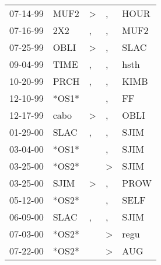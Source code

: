 \begin{supertabular}{p{0.07\textwidth}p{0.06\textwidth}p{0.02\textwidth}p{0.02\textwidth}p{0.06\textwidth}}
 07-14-99\textsuperscript{} &           MUF2\textsuperscript{} &     \textgreater &             , &          HOUR\textsuperscript{} \\
 07-16-99\textsuperscript{} &            2X2\textsuperscript{} &                , &             , &          MUF2\textsuperscript{} \\
 07-25-99\textsuperscript{} &           OBLI\textsuperscript{} &     \textgreater &             , &          SLAC\textsuperscript{} \\
 09-04-99\textsuperscript{} &           TIME\textsuperscript{} &                , &             , &          hsth\textsuperscript{} \\
 10-20-99\textsuperscript{} &           PRCH\textsuperscript{} &                , &             , &          KIMB\textsuperscript{} \\
 12-10-99\textsuperscript{} &                            *OS1* &                  &             , &            FF\textsuperscript{} \\
 12-17-99\textsuperscript{} &           cabo\textsuperscript{} &     \textgreater &             , &          OBLI\textsuperscript{} \\
 01-29-00\textsuperscript{} &           SLAC\textsuperscript{} &                , &             , &          SJIM\textsuperscript{} \\
 03-04-00\textsuperscript{} &                            *OS1* &                  &             , &          SJIM\textsuperscript{} \\
 03-25-00\textsuperscript{} &                            *OS2* &                  &  \textgreater &          SJIM\textsuperscript{} \\
 03-25-00\textsuperscript{} &           SJIM\textsuperscript{} &     \textgreater &             , &          PROW\textsuperscript{} \\
 05-12-00\textsuperscript{} &                            *OS2* &                  &             , &          SELF\textsuperscript{} \\
 06-09-00\textsuperscript{} &           SLAC\textsuperscript{} &                , &             , &          SJIM\textsuperscript{} \\
 07-03-00\textsuperscript{} &                            *OS2* &                  &  \textgreater &          regu\textsuperscript{} \\
 07-22-00\textsuperscript{} &                            *OS2* &                  &  \textgreater &           AUG\textsuperscript{} \\

\end{supertabular}
